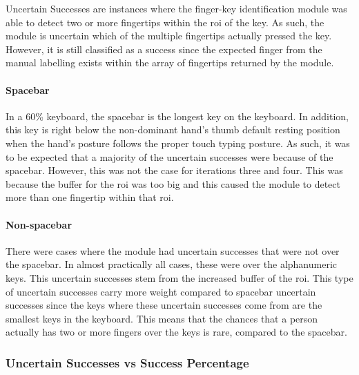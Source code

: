 \documentclass{report}
\begin{document}
Uncertain Successes are instances where the finger-key identification module was
able to detect two or more fingertips within the \ac{roi} of the key. As such,
the module is uncertain which of the multiple fingertips actually pressed the
key. However, it is still classified as a success since the expected finger from
the manual labelling exists within the array of fingertips returned by the
module.

\paragraph{Spacebar}
In a 60\% keyboard, the spacebar is the longest key on the keyboard. In
addition, this key is right below the non-dominant hand's thumb default resting
position when the hand's posture follows the proper touch typing posture. As
such, it was to be expected that a majority of the uncertain successes were
because of the spacebar. However, this was not the case for iterations three and
four. This was because the buffer for the \ac{roi} was too big and this caused
the module to detect more than one fingertip within that \ac{roi}.

\paragraph{Non-spacebar}

There were cases where the module had uncertain successes that were not over the
spacebar. In almost practically all cases, these were over the alphanumeric
keys. This uncertain successes stem from the increased buffer of the \ac{roi}.
This type of uncertain successes carry more weight compared to spacebar
uncertain successes since the keys where these uncertain successes come from are
the smallest keys in the keyboard. This means that the chances that a person
actually has two or more fingers over the keys is rare, compared to the
spacebar.


\subsubsection{Uncertain Successes vs Success Percentage}
\label{section:rd-uncertain vs success}
\end{document}
